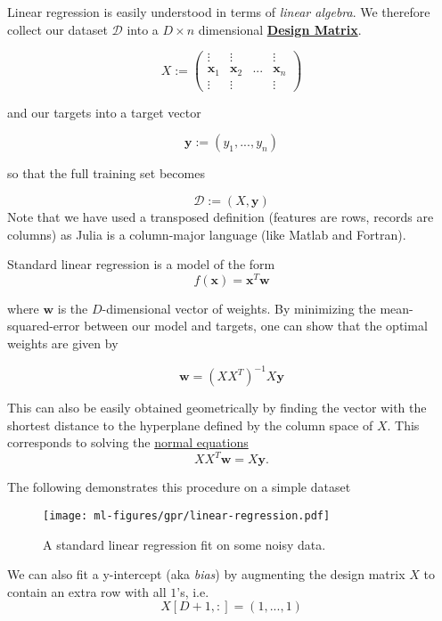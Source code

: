 Linear regression is easily understood in terms of \textit{linear algebra}. We therefore collect our dataset $\mathcal{D}$ into a $D \times n$ dimensional \href{https://en.wikipedia.org/wiki/Design_matrix}{\textbf{Design Matrix}}. 

\begin{equation}
  X := \begin{pmatrix}
    \vdots & \vdots & & \vdots \\
    \mathbf{x}_1 & \mathbf{x}_2 & ... & \mathbf{x}_n \\
    \vdots & \vdots & & \vdots
  \end{pmatrix}
\end{equation}

and our targets into a target vector

\begin{equation}
  \mathbf{y} := (y_1, ..., y_n)
\end{equation}

so that the full training set becomes

\begin{equation}
  \mathcal{D} := (X, \mathbf{y})
\end{equation}
Note that we have used a transposed definition (features are rows, records are columns) as Julia is a column-major language (like Matlab and Fortran).

Standard linear regression is a model of the form
\begin{equation}
  f(\mathbf{x}) = \mathbf{x}^T\mathbf{w}
\end{equation}

where $\mathbf{w}$ is the $D$-dimensional vector of weights. By minimizing the mean-squared-error between our model and targets, one can show that the optimal weights are given by

\begin{equation}
  \mathbf{w} = (XX^T)^{-1}X\mathbf{y}
\end{equation}

This can also be easily obtained geometrically by finding the vector with the shortest distance to the hyperplane defined by the column space of $X$. This corresponds to solving the \href{https://en.wikipedia.org/wiki/Ordinary_least_squares#Normal_equations}{normal equations}
\begin{equation}
  XX^T \mathbf{w} = X\mathbf{y}.
\end{equation}

The following demonstrates this procedure on a simple dataset
\begin{figure}[h]
  \begin{centering}
    \texttt{[image: ml-figures/gpr/linear-regression.pdf]}
  \end{centering}
  \caption{A standard linear regression fit on some noisy data.}
\end{figure}
We can also fit a y-intercept (aka \textit{bias}) by augmenting the design matrix $X$ to contain an extra row with all $1$'s, i.e.
\begin{equation}
  X[D+1, :] = (1, ..., 1)
\end{equation}

